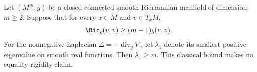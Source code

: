 Let $(M^m,g)$ be a closed connected smooth Riemannian manifold of dimension
$m\geq2$. Suppose that for every $x\in M$ and $v\in T_xM$,
\[
 \Ric_g(v,v)\geq(m-1)g(v,v).
\]
For the nonnegative Laplacian $\Delta=-\operatorname{div}_g\nabla$, let
$\lambda_1$ denote its smallest positive eigenvalue on smooth real functions.
Then $\lambda_1\geq m$. This classical bound makes no equality-rigidity claim.
